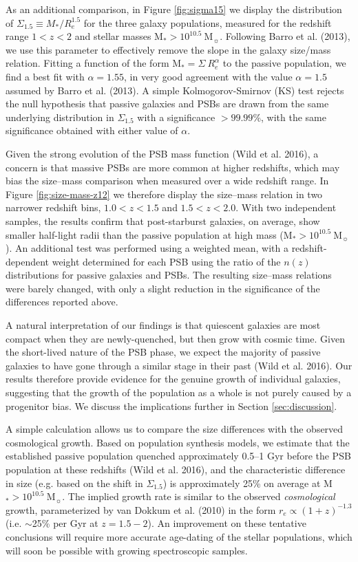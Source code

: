 \documentclass[a4paper,fleqn,usenatbib,useAMS]{mnras}
\begin{document}
As an additional comparison, in Figure \ref{fig:sigma15} we display
the distribution of $\Sigma_{1.5}\equiv M_{\ast}/R_e^{1.5}$ for the
three galaxy populations, measured for the redshift range $1<z<2$ and
stellar masses M$_{\ast}> 10^{10.5} ~$M$_{\sun}$.  Following Barro et
al. (2013), we use this parameter to effectively remove the slope in
the galaxy size/mass relation.  Fitting a function of the form
M$_{\ast} = \Sigma ~ R_e^{\alpha}$ to the passive population, we find
a best fit with $\alpha=1.55$, in very good agreement with the value
$\alpha=1.5$ assumed by Barro et al. (2013).  A simple
Kolmogorov-Smirnov (KS) test rejects the null hypothesis that passive
galaxies and PSBs are drawn from the same underlying distribution in
$\Sigma_{1.5}$ with a significance $>99.99$\%, with the same significance
obtained with either value of $\alpha$.


Given the strong evolution of the PSB mass function (Wild et
al. 2016), a concern is that massive PSBs are more common at higher
redshifts, which may bias the size--mass comparison when measured over
a wide redshift range. In Figure \ref{fig:size-mass-z12} we therefore
display the size--mass relation in two narrower redshift bins,
$1.0<z<1.5$ and $1.5<z<2.0$. With two independent samples, the results
confirm that post-starburst galaxies, on average, show smaller
half-light radii than the passive population at high mass
(M$_{\ast}> 10^{10.5} ~$M$_{\sun}$).  An additional test was performed
using a weighted mean, with a redshift-dependent weight determined for
each PSB using the ratio of the $n(z)$ distributions for passive
galaxies and PSBs. The resulting size--mass relations were barely
changed, with only a slight reduction in the significance of the
differences reported above.



A natural interpretation of our findings is that quiescent galaxies
are most compact when they are newly-quenched, but then grow with
cosmic time. Given the short-lived nature of the PSB phase, we expect
the majority of  passive galaxies to have gone through a similar
stage in their past (Wild et al. 2016).  Our results therefore provide
evidence for the genuine growth of individual galaxies, suggesting
that the growth of the population as a whole is not purely caused by a
progenitor bias. We discuss the implications further in Section \ref{sec:discussion}.

A simple calculation allows us to compare the size differences with the
observed cosmological growth.  Based on population synthesis models,
we estimate that the established passive population quenched
approximately 0.5--1 Gyr before the PSB population at these redshifts
(Wild et al. 2016), and the characteristic difference in size
(e.g. based on the shift in $\Sigma_{1.5}$) is approximately 25\% on
average at M$_{\ast}> 10^{10.5} ~$M$_{\sun}$. The implied growth rate
is similar  to the observed {\em cosmological}
growth, parameterized by van Dokkum et al. (2010) in the form $r_e
\propto (1+z)^{-1.3}$ (i.e. $\sim$25\% per Gyr at $z=1.5-2$). An
improvement on these tentative conclusions will require more accurate
age-dating of the stellar populations, which will soon be possible
with growing spectroscopic samples.
\end{document}

